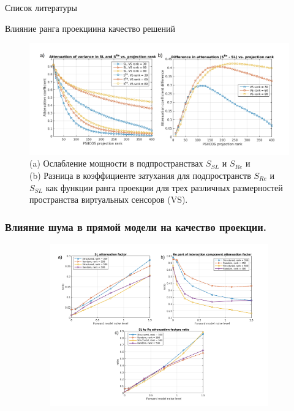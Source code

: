 \documentclass[12pt]{beamer}
\begin{document}
\begin{frame}[t,allowframebreaks]{Список литературы}
    \tiny
    
    
    
\end{frame}

\begin{frame}[t]{Влияние ранга проекции}{на качество решений}
    \begin{figure}[htbp]
    \includegraphics[width=\textwidth]{../images/psiicos_paper/Figure14_hr.jpg}
    {\footnotesize(a) Ослабление мощности в подпространствах $S_{SL}$ и $S_{Re}$ и\\
        (b) Разница в коэффициенте затухания для подпространств $S_{Re}$ и $S_{SL}$ как
        функции ранга проекции для трех различных размерностей пространства виртуальных
        сенсоров (VS).
    }\label{fig:14}
    \end{figure}
\end{frame}

\begin{frame}[t]
    \frametitle{Влияние шума в прямой модели на качество проекции.}
    \begin{figure}[htbp]
    \includegraphics[width=1\textwidth, height=7cm]{../images/psiicos_paper/Figure15_hr.jpg}
 \end{figure}
\end{frame}
\end{document}
